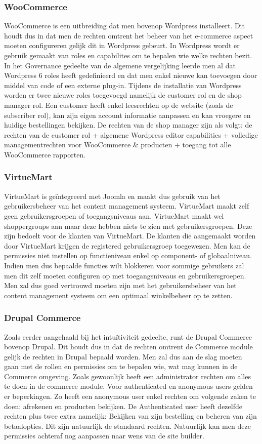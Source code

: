 \subsubsection{WooCommerce}
WooCommerce is een uitbreiding dat men bovenop Wordpress installeert. Dit houdt dus in dat men de rechten omtrent het beheer van het e-commerce aspect moeten configureren gelijk dit in Wordpress gebeurt. In Wordpress wordt er gebruik gemaakt van roles en capabilites om te bepalen wie welke rechten bezit. In het Governance gedeelte van de algemene vergelijking leerde men al dat Wordpress 6 roles heeft gedefinieerd en dat men enkel nieuwe kan toevoegen door middel van code of een externe plug-in. Tijdens de installatie van Wordpress worden er twee nieuwe roles toegevoegd namelijk de customer rol en de shop manager rol. Een customer heeft enkel leesrechten op de website (zoals de subscriber rol), kan zijn eigen account informatie aanpassen en kan vroegere en huidige bestellingen bekijken. De rechten van de shop manager zijn als volgt: de rechten van de customer rol + algemene Wordpress editor capabilities + volledige managementrechten voor WooCommerce \& producten + toegang tot alle WooCommerce rapporten.
\subsubsection{VirtueMart}
VirtueMart is geïntegreerd met Joomla en maakt dus gebruik van het gebruikersbeheer van het content management systeem. VirtueMart maakt zelf geen gebruikersgroepen of toegangsniveaus aan. VirtueMart maakt wel shoppergroups aan maar deze hebben niets te zien met gebruikersgroepen. Deze zijn bedoelt voor de klanten van VirtueMart. De klanten die aangemaakt worden door VirtueMart krijgen de registered gebruikersgroep toegewezen. Men kan de permissies niet instellen op functieniveau enkel op component- of globaalniveau. Indien men dus bepaalde functies wilt blokkeren voor sommige gebruikers zal men dit zelf moeten configuren op met toegangsniveaus en gebruikersgroepen. Men zal dus goed vertrouwd moeten zijn met het gebruikersbeheer van het content management systeem om een optimaal winkelbeheer op te zetten.
\subsubsection{Drupal Commerce}
Zoals eerder aangehaald bij het intuïtiviteit gedeelte, runt de Drupal Commerce bovenop Drupal. Dit houdt dus in dat de rechten omtrent de Commerce module gelijk de rechten in Drupal bepaald worden. Men zal dus aan de slag moeten gaan met de rollen en permissies om te bepalen wie, wat mag kunnen in de Commerce omgeving. Zoals gewoonlijk heeft een administrator rechten om alles te doen in de commerce module. Voor authenticated en anonymous users gelden er beperkingen. Zo heeft een anonymous user enkel rechten om volgende zaken te doen: afrekenen en producten bekijken. De Authenticated user heeft dezelfde rechten plus twee extra namelijk: Bekijken van zijn bestelling en beheren van zijn betaalopties. Dit zijn natuurlijk de standaard rechten. Natuurlijk kan men deze permissies achteraf nog aanpassen naar wens van de site builder. 


